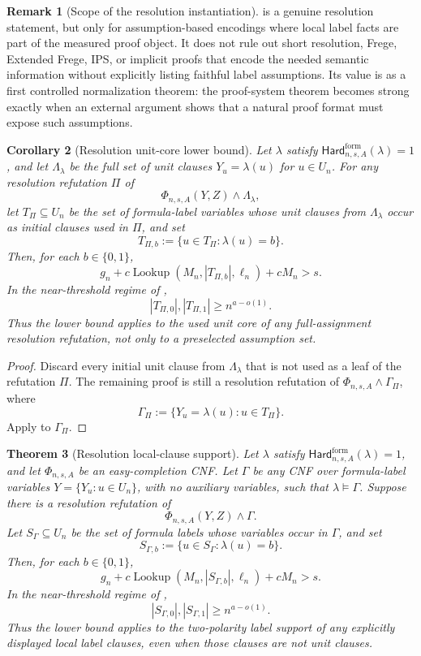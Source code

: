 \documentclass[11pt]{article}
\newtheorem{theorem}{Theorem}[section]
\newtheorem{corollary}[theorem]{Corollary}
\theoremstyle{definition}
\newtheorem{remark}[theorem]{Remark}
\newcommand{\bits}{\{0,1\}}
\newcommand{\Lookup}{\operatorname{Lookup}}
\newcommand{\HardF}{\mathsf{Hard}^{\mathrm{form}}}
\begin{document}
\begin{remark}[Scope of the resolution instantiation]\label{rem:assumption-resolution-scope}
 is a genuine resolution statement, but only for assumption-based encodings where local label facts are part of the measured proof object.  It does not rule out short resolution, Frege, Extended Frege, IPS, or implicit proofs that encode the needed semantic information without explicitly listing faithful label assumptions.  Its value is as a first controlled normalization theorem: the proof-system theorem becomes strong exactly when an external argument shows that a natural proof format must expose such assumptions.
\end{remark}

\begin{corollary}[Resolution unit-core lower bound]\label{cor:resolution-unit-core}
Let \(\lambda\) satisfy \(\HardF_{n,s,A}(\lambda)=1\), and let \(\Lambda_\lambda\) be the full set of unit clauses \(Y_u=\lambda(u)\) for \(u\in U_n\).  For any resolution refutation \(\Pi\) of
\[
  \Phi_{n,s,A}(Y,Z)\wedge\Lambda_\lambda,
\]
let \(T_\Pi\subseteq U_n\) be the set of formula-label variables whose unit clauses from \(\Lambda_\lambda\) occur as initial clauses used in \(\Pi\), and set
\[
  T_{\Pi,b}:=\{u\in T_\Pi:\lambda(u)=b\}.
\]
Then, for each \(b\in\bits\),
\[
  g_n+c\Lookup(M_n,|T_{\Pi,b}|,\ell_n)+cM_n>s.
\]
In the near-threshold regime of ,
\[
  |T_{\Pi,0}|,|T_{\Pi,1}|\ge n^{a-o(1)}.
\]
Thus the lower bound applies to the \emph{used unit core} of any full-assignment resolution refutation, not only to a preselected assumption set.
\end{corollary}

\begin{proof}
Discard every initial unit clause from \(\Lambda_\lambda\) that is not used as a leaf of the refutation \(\Pi\).  The remaining proof is still a resolution refutation of \(\Phi_{n,s,A}\wedge\Gamma_\Pi\), where
\[
  \Gamma_\Pi:=\{Y_u=\lambda(u):u\in T_\Pi\}.
\]
Apply  to \(\Gamma_\Pi\).
\end{proof}

\begin{theorem}[Resolution local-clause support]\label{thm:resolution-local-clause-support}
Let \(\lambda\) satisfy \(\HardF_{n,s,A}(\lambda)=1\), and let \(\Phi_{n,s,A}\) be an easy-completion CNF.  Let \(\Gamma\) be any CNF over formula-label variables \(Y=\{Y_u:u\in U_n\}\), with no auxiliary variables, such that \(\lambda\models\Gamma\).  Suppose there is a resolution refutation of
\[
  \Phi_{n,s,A}(Y,Z)\wedge\Gamma.
\]
Let \(S_\Gamma\subseteq U_n\) be the set of formula labels whose variables occur in \(\Gamma\), and set
\[
  S_{\Gamma,b}:=\{u\in S_\Gamma:\lambda(u)=b\}.
\]
Then, for each \(b\in\bits\),
\[
  g_n+c\Lookup(M_n,|S_{\Gamma,b}|,\ell_n)+cM_n>s.
\]
In the near-threshold regime of ,
\[
  |S_{\Gamma,0}|,|S_{\Gamma,1}|\ge n^{a-o(1)}.
\]
Thus the lower bound applies to the two-polarity label support of any explicitly displayed local label clauses, even when those clauses are not unit clauses.
\end{theorem}
\end{document}
